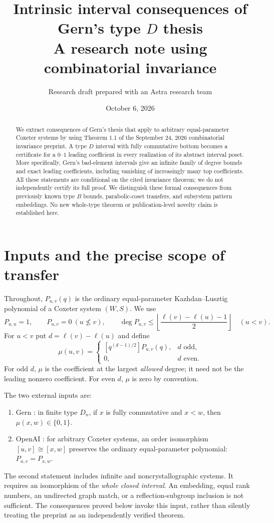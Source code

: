 \documentclass[11pt]{article}
\title{Intrinsic interval consequences of Gern's type $D$ thesis\\
\large A research note using combinatorial invariance}
\author{Research draft prepared with an Astra research team}
\date{October 6, 2026}
\theoremstyle{definition}\newtheorem{definition}[theorem]{Definition}
\theoremstyle{remark}\newtheorem{remark}[theorem]{Remark}
\begin{document}
\maketitle
\begin{abstract}
We extract consequences of Gern's thesis that apply to arbitrary equal-parameter
Coxeter systems by using Theorem 1.1 of the September 24, 2026 combinatorial
invariance preprint. A type $D$ interval with fully commutative bottom becomes
a certificate for a $0$--$1$ leading coefficient in every realization of its
abstract interval poset. More specifically, Gern's bad-element intervals give
an infinite family of degree bounds and exact leading coefficients, including
vanishing of increasingly many top coefficients. All these statements are
conditional on the cited invariance theorem; we do not independently certify
its full proof. We distinguish these formal consequences from previously
known type $B$ bounds, parabolic-coset transfers, and subsystem pattern
embeddings. No new whole-type theorem or publication-level novelty claim is
established here.
\end{abstract}

\section{Inputs and the precise scope of transfer}
Throughout, $P_{u,v}(q)$ is the ordinary equal-parameter Kazhdan--Lusztig
polynomial of a Coxeter system $(W,S)$. We use
\[
 P_{u,u}=1,\qquad P_{u,v}=0\ (u\not\leq v),\qquad
 \deg P_{u,v}\leq\left\lfloor\frac{\ell(v)-\ell(u)-1}{2}\right\rfloor
 \quad(u<v).
\]
For $u<v$ put $d=\ell(v)-\ell(u)$ and define
\[
 \mu(u,v)=\begin{cases}
 [q^{(d-1)/2}]P_{u,v}(q),&d\text{ odd},\\
 0,&d\text{ even}.
 \end{cases}
\]
For odd $d$, $\mu$ is the coefficient at the largest \emph{allowed}
degree; it need not be the leading nonzero coefficient. For even
$d$, $\mu$ is zero by convention.

The two external inputs are:
\begin{enumerate}
\item Gern \cite[Theorem 4.5.11]{gern}: in finite type $D_n$, if $x$ is
fully commutative and $x<w$, then $\mu(x,w)\in\{0,1\}$.
\item OpenAI \cite[Theorem 1.1]{ci}: for arbitrary Coxeter systems,
an order isomorphism $[u,v]\cong[x,w]$ preserves the ordinary
equal-parameter polynomial: $P_{u,v}=P_{x,w}$.
\end{enumerate}
The second statement includes infinite and noncrystallographic systems.
It requires an isomorphism of the \emph{whole closed interval}.
An embedding, equal rank numbers, an undirected graph match, or a
reflection-subgroup inclusion is not sufficient.
The consequences proved below invoke this input, rather than silently
treating the preprint as an independently verified theorem.
\end{document}
